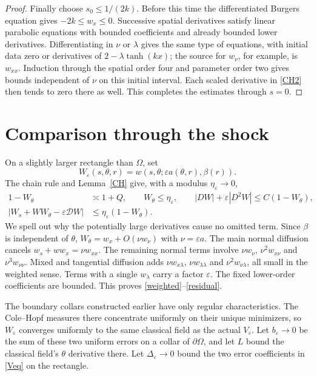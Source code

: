 \documentclass[11pt]{article}
\begin{document}
\begin{proof}
Finally choose $s_0\le1/(2k)$. Before this time the differentiated Burgers equation gives $-2k\le w_x\le0$. Successive spatial derivatives satisfy linear parabolic equations with bounded coefficients and already bounded lower derivatives. Differentiating in $\nu$ or $\lambda$ gives the same type of equations, with initial data zero or derivatives of $2-\lambda\tanh(kx)$; the source for $w_\nu$, for example, is $w_{xx}$. Induction through the spatial order four and parameter order two gives bounds independent of $\nu$ on this initial interval. Each scaled derivative in \eqref{CH2} then tends to zero there as well. This completes the estimates through $s=0$.
\end{proof}

\section{Comparison through the shock}
On a slightly larger rectangle than $\Omega$, set
\[
 W_\varepsilon(s,\theta,r)=w(s,\theta;\varepsilon a(\theta,r),\beta(r)).
\]
The chain rule and Lemma~\ref{CH} give, with a modulus $\eta_\varepsilon\to0$,
\begin{align}
 1-W_\theta&\asymp1+Q,\qquad W_\theta\le\eta_\varepsilon,
 \qquad |DW|+\varepsilon|D^2W|\le C(1-W_\theta),\label{weighted}\\
 |W_s+WW_\theta-\varepsilon\mathcal D W|&\le\eta_\varepsilon(1-W_\theta).\label{residual}
\end{align}
We spell out why the potentially large derivatives cause no omitted term. Since $\beta$ is independent of $\theta$, $W_\theta=w_x+O(\nu w_\nu)$ with $\nu=\varepsilon a$. The main normal diffusion cancels $w_s+ww_x=\nu w_{xx}$. The remaining normal terms involve $\nu w_\nu$, $\nu^2w_{x\nu}$ and $\nu^3w_{\nu\nu}$. Mixed and tangential diffusion adds $\nu w_{x\lambda}$, $\nu w_{\lambda\lambda}$ and $\nu^2w_{\nu\lambda}$, all small in the weighted sense. Terms with a single $w_\lambda$ carry a factor $\varepsilon$. The fixed lower-order coefficients are bounded. This proves \eqref{weighted}--\eqref{residual}.

The boundary collars constructed earlier have only regular characteristics. The Cole--Hopf measures there concentrate uniformly on their unique minimizers, so $W_\varepsilon$ converges uniformly to the same classical field as the actual $V_\varepsilon$. Let $b_\varepsilon\to0$ be the sum of these two uniform errors on a collar of $\partial\Omega$, and let $L$ bound the classical field's $\theta$ derivative there. Let $\Delta_\varepsilon\to0$ bound the two error coefficients in \eqref{Veq} on the rectangle.
\end{document}
